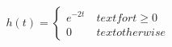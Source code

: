 \documentclass[preview]{standalone}
\begin{document}
\begin{align*}
h ( t ) = \begin{cases} e^{-2 t } & \ t ex t {for }  t  \geq 0 \\ 0 & \ t ex t {o t h erwise} \end{cases}
\end{align*}
\end{document}
